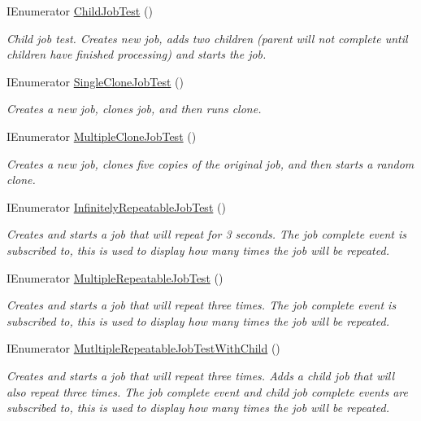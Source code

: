 \begin{DoxyCompactItemize}
I\+Enumerator \hyperlink{class_example_job_test_a95dc6aea129056f6565484c7efd6ab03}{Child\+Job\+Test} ()
\begin{DoxyCompactList}\small\item\em Child job test. Creates new job, adds two children (parent will not complete until children have finished processing) and starts the job. \end{DoxyCompactList}\item 
I\+Enumerator \hyperlink{class_example_job_test_a7a5819f751f3ba68941dd5530bf7a365}{Single\+Clone\+Job\+Test} ()
\begin{DoxyCompactList}\small\item\em Creates a new job, clones job, and then runs clone. \end{DoxyCompactList}\item 
I\+Enumerator \hyperlink{class_example_job_test_a707273ae104f9aac979fa8d697e306b5}{Multiple\+Clone\+Job\+Test} ()
\begin{DoxyCompactList}\small\item\em Creates a new job, clones five copies of the original job, and then starts a random clone. \end{DoxyCompactList}\item 
I\+Enumerator \hyperlink{class_example_job_test_a8941dbc9a2ba2c401785414a669b6331}{Infinitely\+Repeatable\+Job\+Test} ()
\begin{DoxyCompactList}\small\item\em Creates and starts a job that will repeat for 3 seconds. The job complete event is subscribed to, this is used to display how many times the job will be repeated. \end{DoxyCompactList}\item 
I\+Enumerator \hyperlink{class_example_job_test_a11f7ec3104852950a7f35208b75671e5}{Multiple\+Repeatable\+Job\+Test} ()
\begin{DoxyCompactList}\small\item\em Creates and starts a job that will repeat three times. The job complete event is subscribed to, this is used to display how many times the job will be repeated. \end{DoxyCompactList}\item 
I\+Enumerator \hyperlink{class_example_job_test_a4d476fb823d8c82dfe1fe17f37d4fdf7}{Mutltiple\+Repeatable\+Job\+Test\+With\+Child} ()
\begin{DoxyCompactList}\small\item\em Creates and starts a job that will repeat three times. Adds a child job that will also repeat three times. The job complete event and child job complete events are subscribed to, this is used to display how many times the job will be repeated. \end{DoxyCompactList}\end{DoxyCompactItemize}


